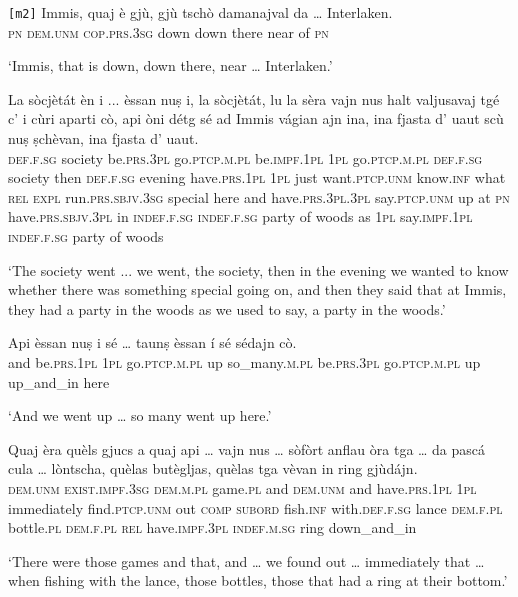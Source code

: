 \begin{linenumbers}
\gll  \texttt{[m2]}  Immis, quaj è gjù, gjù tschò damanajval da … Interlaken.\\
{} \textsc{pn} \textsc{dem.unm} \textsc{cop.prs.3sg} down down there near of {} \textsc{pn} \\
\end{linenumbers}
\medskip
\glt `Immis, that is down, down there, near … Interlaken.'
\medskip


\begin{linenumbers}
	\gll La sòcjètát èn i ... èssan nuṣ i, la sòcjètát, lu la sèra vajn nus halt valjusavaj tgé c' i cùri aparti cò, api òni détg sé ad Immis vágian ajn ina, ina fjasta d' uaut scù nuṣ ṣchèvan, ina fjasta d' uaut.\\
	\textsc{def.f.sg} society be.\textsc{prs.3pl} go.\textsc{ptcp.m.pl} {} be.\textsc{impf.1pl} \textsc{1pl} go.\textsc{ptcp.m.pl} \textsc{def.f.sg} society then \textsc{def.f.sg} evening have.\textsc{prs.1pl} \textsc{1pl} just want.\textsc{ptcp.unm} know.\textsc{inf} what \textsc{rel} \textsc{expl} run.\textsc{prs.sbjv.3sg} special here and have.\textsc{prs.3pl.3pl} say.\textsc{ptcp.unm} up at \textsc{pn} have.\textsc{prs.sbjv.3pl} in \textsc{indef.f.sg} \textsc{indef.f.sg} party of woods as \textsc{1pl} say.\textsc{impf.1pl} \textsc{indef.f.sg} party of woods\\
\end{linenumbers}
\medskip
\glt `The society went ... we went, the society, then in the evening we wanted to know whether there was something special going on, and then they said that at Immis, they had a party in the woods as we used to say, a party in the woods.'
\medskip

\begin{linenumbers}
\gll    Api èssan nuṣ i sé … taunṣ èssan í sé sédajn cò.\\
and be.\textsc{prs.1pl} \textsc{1pl} go.\textsc{ptcp.m.pl} up {} so\_many.\textsc{m.pl} be.\textsc{prs.3pl} go.\textsc{ptcp.m.pl} up up\_and\_in here\\
\end{linenumbers}
\medskip
\glt `And we went up … so many went up here.'
\medskip

\begin{linenumbers}
\gll    Quaj èra quèls gjucs a quaj api … vajn nus … sòfòrt\footnotemark{} anflau òra tga … da pascá cula … lòntscha, quèlas butègljas, quèlas tga vèvan in ring gjùdájn.\\
\textsc{dem.unm} \textsc{exist.impf.3sg} \textsc{dem.m.pl} game.\textsc{pl} and  \textsc{dem.unm} and {} have.\textsc{prs.1pl} \textsc{1pl} {} immediately find.\textsc{ptcp.unm} out \textsc{comp} {} \textsc{subord} fish.\textsc{inf} with.\textsc{def.f.sg} {} lance \textsc{dem.f.pl} bottle.\textsc{pl} \textsc{dem.f.pl} \textsc{rel} have.\textsc{impf.3pl} \textsc{indef.m.sg} ring down\_and\_in\\
\end{linenumbers}
\medskip
\glt `There were those games and that, and … we found out … immediately that … when fishing with the lance, those bottles, those that had a ring at their bottom.'
\medskip

